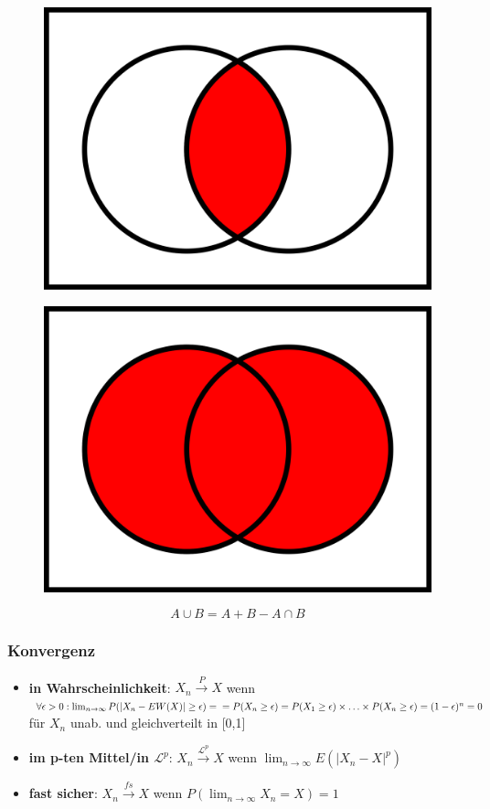 \begin{figure}[ht]
    \centering
    \begin{minipage}{.5\textwidth}
      \centering
      \includegraphics[width=.4\linewidth]{mehrdimWktrechnung/Venn0001.svg.png}
      \label{fig:schnittmenge}
    \end{minipage}%
    \begin{minipage}{.5\textwidth}
      \centering
      \includegraphics[width=.4\linewidth]{mehrdimWktrechnung/Venn0111.svg.png}
      \label{fig:vereinigungsmenge}
    \end{minipage}
\end{figure}

\begin{equation*}
    A\cup B = A+B-A\cap B
\end{equation*}

\subsubsection{Konvergenz}

\begin{itemize}
    \item \textbf{in Wahrscheinlichkeit}: \(X_n \xrightarrow{P} X\) wenn \(\forall \epsilon > 0: \lim_{n\rightarrow\infty}P(|X_n-EW(X)| \geq\epsilon)=\\=P(X_n \geq\epsilon)=P(X_1\geq\epsilon)\times \hdots \times P(X_n\geq\epsilon)=(1-\epsilon)^n = 0\) für \(X_n\) unab. und gleichverteilt in [0,1]
    \item \textbf{im p-ten Mittel/in \(\mathcal{L}^p\)}: \(X_n \xrightarrow{\mathcal{L}^p} X\) wenn \(\lim_{n\rightarrow\infty}E(|X_n-X|^p)\)
    \item \textbf{fast sicher}: \(X_n \xrightarrow{fs} X\) wenn \(P(\lim_{n\rightarrow\infty}X_n=X)=1\)
\end{itemize}

